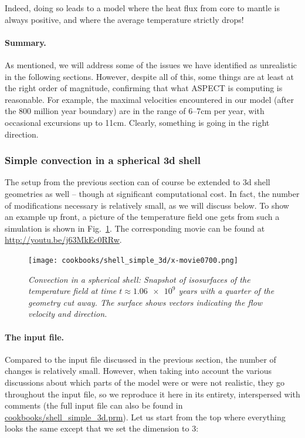 \documentclass{article}
\newcommand{\aspect}{\textsc{ASPECT}}
\begin{document}
Indeed, doing so leads to a model where the heat flux from core to mantle is
always positive, and where the average temperature strictly drops!


\paragraph{Summary.} As mentioned, we will address some of the issues we have
identified as unrealistic in the following sections.
However, despite all of this, some things are at least at the right order of
magnitude, confirming that what \aspect{} is computing is reasonable. For
example, the maximal velocities encountered in our model (after the 800 million
year boundary) are in the range of 6--7cm per year, with occasional excursions
up to 11cm. Clearly, something is going in the right direction.


\subsubsection{Simple convection in a spherical 3d shell}
\label{sec:shell-simple-3d}

The setup from the previous section can of course be extended to 3d shell
geometries as well -- though at significant computational cost. In fact, the
number of modifications necessary is relatively small, as we will discuss below.
To show an example up front, a picture of the temperature field one gets from
such a simulation is shown in Fig.~\ref{fig:simple-shell-3d}. The
corresponding movie can be found at \url{http://youtu.be/j63MkEc0RRw}.

\begin{figure}[tb]
\centering
\texttt{[image: cookbooks/shell\_simple\_3d/x-movie0700.png]}
\caption{\it Convection in a spherical shell: Snapshot of
isosurfaces of the temperature field at time $t\approx \num{1.06e9}$ years
with a quarter of the geometry cut away. The surface shows
vectors indicating the flow velocity and direction.}
\label{fig:simple-shell-3d}
\end{figure}

\paragraph{The input file.}
Compared to the input file discussed in the previous section, the number of
changes is relatively small. However, when taking into account the various
discussions about which parts of the model were or were not realistic, they go
throughout the input file, so we reproduce it here in its entirety, interspersed
with comments (the full input file can also be found in
\url{cookbooks/shell_simple_3d.prm}). Let us start from the top where everything
looks the same except that we set the dimension to 3:
\end{document}
